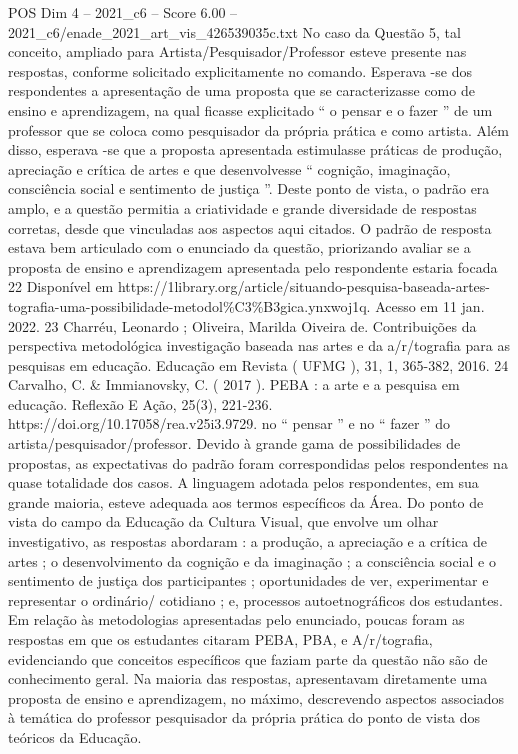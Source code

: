 \begin{textsample}{POS Dim 4 – 2021\_c6 – Score 6.00 – 2021\_c6/enade\_2021\_art\_vis\_426539035c.txt}
No caso da Questão 5, tal conceito, ampliado para Artista/Pesquisador/Professor esteve presente nas respostas, conforme solicitado explicitamente no comando.
Esperava -se dos respondentes a apresentação de uma proposta que se caracterizasse como de ensino e aprendizagem, na qual ficasse explicitado “ o pensar e o fazer ” de um professor que se coloca como pesquisador da própria prática e como artista.
Além disso, esperava -se que a proposta apresentada estimulasse práticas de produção, apreciação e crítica de artes e que desenvolvesse “ cognição, imaginação, consciência social e sentimento de justiça ”.
Deste ponto de vista, o padrão era amplo, e a questão permitia a criatividade e grande diversidade de respostas corretas, desde que vinculadas aos aspectos aqui citados.
O padrão de resposta estava bem articulado com o enunciado da questão, priorizando avaliar se a proposta de ensino e aprendizagem apresentada pelo respondente estaria focada 22 Disponível em https://1library.org/article/situando-pesquisa-baseada-artes-tografia-uma-possibilidade-metodol\%C3\%B3gica.ynxwoj1q.
Acesso em 11 jan. 2022. 23 Charréu, Leonardo ; Oliveira, Marilda Oiveira de.
Contribuições da perspectiva metodológica investigação baseada nas artes e da a/r/tografia para as pesquisas em educação.
Educação em Revista ( UFMG ), 31, 1, 365-382, 2016. 24 Carvalho, C. \& Immianovsky, C. ( 2017 ).
PEBA : a arte e a pesquisa em educação.
Reflexão E Ação, 25(3), 221-236. https://doi.org/10.17058/rea.v25i3.9729. no “ pensar ” e no “ fazer ” do artista/pesquisador/professor.
Devido à grande gama de possibilidades de propostas, as expectativas do padrão foram correspondidas pelos respondentes na quase totalidade dos casos.
A linguagem adotada pelos respondentes, em sua grande maioria, esteve adequada aos termos específicos da Área.
Do ponto de vista do campo da Educação da Cultura Visual, que envolve um olhar investigativo, as respostas abordaram : a produção, a apreciação e a crítica de artes ; o desenvolvimento da cognição e da imaginação ; a consciência social e o sentimento de justiça dos participantes ; oportunidades de ver, experimentar e representar o ordinário/ cotidiano ; e, processos autoetnográficos dos estudantes.
Em relação às metodologias apresentadas pelo enunciado, poucas foram as respostas em que os estudantes citaram PEBA, PBA, e A/r/tografia, evidenciando que conceitos específicos que faziam parte da questão não são de conhecimento geral.
Na maioria das respostas, apresentavam diretamente uma proposta de ensino e aprendizagem, no máximo, descrevendo aspectos associados à temática do professor pesquisador da própria prática do ponto de vista dos teóricos da Educação.

\end{textsample}
